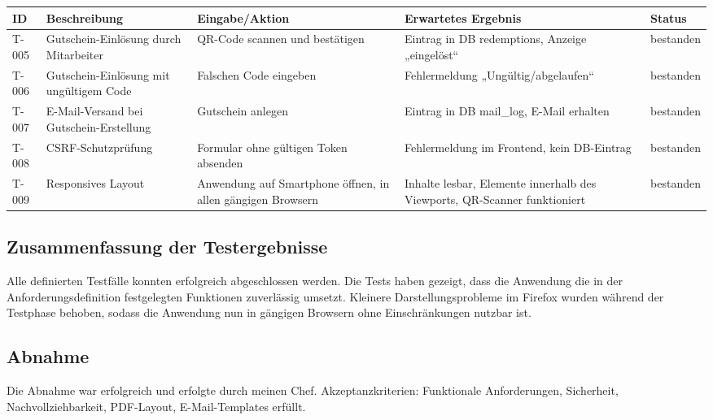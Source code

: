 \begin{center}
\label{tab:testergebnisse2}
\begin{tabularx}{\textwidth}{|L{1.2cm}|X|L{3.2cm}|L{3.2cm}|L{1.6cm}|}
\hline
\textbf{ID} & \textbf{Beschreibung} & \textbf{Eingabe/Aktion} & \textbf{Erwartetes Ergebnis} & \textbf{Status} \\
\hline
T-005 & Gutschein-Einlösung durch Mitarbeiter & QR-Code scannen und bestätigen & Eintrag in DB redemptions, Anzeige „eingelöst“ & bestanden \\
\hline
T-006 & Gutschein-Einlösung mit ungültigem Code & Falschen Code eingeben & Fehlermeldung „Ungültig/abgelaufen“ & bestanden \\
\hline
T-007 & E-Mail-Versand bei Gutschein-Erstellung & Gutschein anlegen & Eintrag in DB mail\_log, E-Mail erhalten & bestanden \\
\hline
T-008 & \ac{CSRF}-Schutzprüfung & Formular ohne gültigen Token absenden & Fehlermeldung im Frontend, kein DB-Eintrag & bestanden \\
\hline
T-009 & Responsives Layout & Anwendung auf Smartphone öffnen, in allen gängigen Browsern & Inhalte lesbar, Elemente innerhalb des Viewports, QR-Scanner funktioniert & bestanden \\
\hline
\end{tabularx}
\end{center}

\subsection{Zusammenfassung der Testergebnisse}
\label{sec:Testergebnisse}
Alle definierten Testfälle konnten erfolgreich abgeschlossen werden.
Die Tests haben gezeigt, dass die Anwendung die in der Anforderungsdefinition festgelegten Funktionen zuverlässig umsetzt.
Kleinere Darstellungsprobleme im Firefox wurden während der Testphase behoben, sodass die Anwendung nun in gängigen Browsern ohne Einschränkungen nutzbar ist.

\subsection{Abnahme}
Die Abnahme war erfolgreich und erfolgte durch meinen Chef.
Akzeptanzkriterien: Funktionale Anforderungen, Sicherheit, Nachvollziehbarkeit, PDF-Layout, E-Mail-Templates erfüllt.
